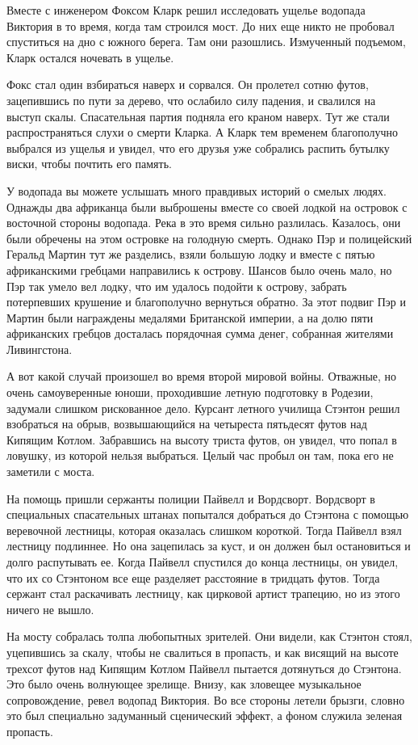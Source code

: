 \documentclass[12pt,a4paper,twoside,openany,svgnames]{memoir}
\begin{document}
Вместе с инженером Фоксом Кларк решил исследовать ущелье водопада Виктория в то время, когда там строился мост. До них еще никто не пробовал спуститься на дно с южного берега. Там они разошлись. Измученный подъемом, Кларк остался ночевать в ущелье.

Фокс стал один взбираться наверх и сорвался. Он пролетел сотню футов, зацепившись по пути за дерево, что ослабило силу падения, и свалился на выступ скалы. Спасательная партия подняла его краном наверх. Тут же стали распространяться слухи о смерти Кларка. А Кларк тем временем благополучно выбрался из ущелья и увидел, что его друзья уже собрались распить бутылку виски, чтобы почтить его память.

У водопада вы можете услышать много правдивых историй о смелых людях. Однажды два африканца были выброшены вместе со своей лодкой на островок с восточной стороны водопада. Река в это время сильно разлилась. Казалось, они были обречены на этом островке на голодную смерть. Однако Пэр и полицейский Геральд Мартин тут же разделись, взяли большую лодку и вместе с пятью африканскими гребцами направились к острову. Шансов было очень мало, но Пэр так умело вел лодку, что им удалось подойти к острову, забрать потерпевших крушение и благополучно вернуться обратно. За этот подвиг Пэр и Мартин были награждены медалями Британской империи, а на долю пяти африканских гребцов досталась порядочная сумма денег, собранная жителями Ливингстона.

А вот какой случай произошел во время второй мировой войны. Отважные, но очень самоуверенные юноши, проходившие летную подготовку в Родезии, задумали слишком рискованное дело. Курсант летного училища Стэнтон решил взобраться на обрыв, возвышающийся на четыреста пятьдесят футов над Кипящим Котлом. Забравшись на высоту триста футов, он увидел, что попал в ловушку, из которой нельзя выбраться. Целый час пробыл он там, пока его не заметили с моста.

На помощь пришли сержанты полиции Пайвелл и Вордсворт. Вордсворт в специальных спасательных штанах попытался добраться до Стэнтона с помощью веревочной лестницы, которая оказалась слишком короткой. Тогда Пайвелл взял лестницу подлиннее. Но она зацепилась за куст, и он должен был остановиться и долго распутывать ее. Когда Пайвелл спустился до конца лестницы, он увидел, что их со Стэнтоном все еще разделяет расстояние в тридцать футов. Тогда сержант стал раскачивать лестницу, как цирковой артист трапецию, но из этого ничего не вышло.

На мосту собралась толпа любопытных зрителей. Они видели, как Стэнтон стоял, уцепившись за скалу, чтобы не свалиться в пропасть, и как висящий на высоте трехсот футов над Кипящим Котлом Пайвелл пытается дотянуться до Стэнтона. Это было очень волнующее зрелище. Внизу, как зловещее музыкальное сопровождение, ревел водопад Виктория. Во все стороны летели брызги, словно это был специально задуманный сценический эффект, а фоном служила зеленая пропасть.
\end{document}
